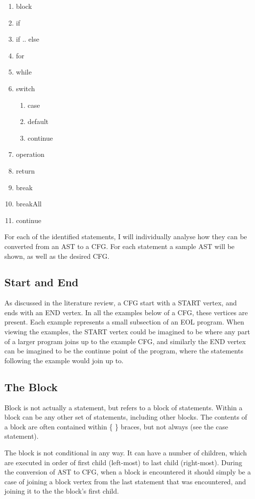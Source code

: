\begin{enumerate}[nolistsep]
\item block
\item if
\item if .. else
\item for
\item while
\item switch
	\begin{enumerate}
	\item case
	\item default
	\item continue
	\end{enumerate}
\item operation
\item return
\item break
\item breakAll
\item continue
\end{enumerate}

For each of the identified statements, I will individually analyse how they can be converted from an AST to a CFG. For each statement a sample AST will be shown, as well as the desired CFG.

\subsection{Start and End}
As discussed in the literature review, a CFG start with a START vertex, and ends with an END vertex. In all the examples below of a CFG, these vertices are present. Each example represents a small subsection of an EOL program. When viewing the examples, the START vertex could be imagined to be where any part of a larger program joins up to the example CFG, and similarly the END vertex can be imagined to be the continue point of the program, where the statements following the example would join up to.

\subsection{The Block}
Block is not actually a statement, but refers to a block of statements. Within a block can be any other set of statements, including other blocks. The contents of a block are often contained within \{ \} braces, but not always (see the case statement).

The block is not conditional in any way. It can have a number of children, which are executed in order of first child (left-most) to last child (right-most). During the conversion of AST to CFG, when a block is encountered it should simply be a case of joining a block vertex from the last statement that was encountered, and joining it to the the block's first child.


